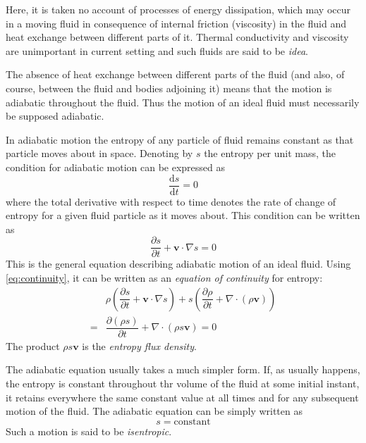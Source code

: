 \documentclass[conference]{IEEEtran}
\theoremstyle{definition}
\theoremstyle{remark}
\begin{document}
    Here, it is taken no account of processes of energy dissipation, which may occur in a moving fluid in consequence of internal friction (viscosity) in the fluid and heat exchange between different parts of it. Thermal conductivity and viscosity are unimportant in current setting and such fluids are said to be \emph{idea}.

    The absence of heat exchange between different parts of the fluid (and also, of course, between the fluid and bodies adjoining it) means that the motion is adiabatic throughout the fluid. Thus the motion of an ideal fluid must necessarily be supposed adiabatic.

    In adiabatic motion the entropy of any particle of fluid remains constant as that particle moves about in space. Denoting by $s$ the entropy per unit mass, the condition for adiabatic motion can be  expressed as
    \begin{equation}
        \dfrac{\mathrm{d} s}{\mathrm{d} t} = 0
    \end{equation}
    where the total derivative with respect to time denotes the rate of change of entropy for a given fluid particle as it moves about. This condition can be written as
    \begin{equation}
        \dfrac{\partial s}{\partial t} + \mathbf{v} \cdot \nabla s = 0
    \end{equation}
    This is the general equation describing adiabatic motion of an ideal fluid. Using \ref{eq:continuity}, it can be written as an \emph{equation of continuity} for entropy:
    \begin{align}
        & \rho \left(\dfrac{\partial s}{\partial t} + \mathbf{v} \cdot \nabla s \right) + s \left(\dfrac{\partial \rho}{\partial t} + \nabla \cdot (\rho \mathbf{v}) \right) \nonumber \\
        =& \dfrac{\partial (\rho s)}{\partial t} + \nabla \cdot (\rho s \mathbf{v}) = 0
    \end{align}
    The product $\rho s \mathbf{v}$ is the \emph{entropy flux density}.

    The adiabatic equation usually takes a much simpler form. If, as usually happens, the entropy is constant throughout thr volume of the fluid at some initial instant, it retains everywhere the same constant value at all times and for any subsequent motion of the fluid. The adiabatic equation can be simply written as
    \begin{equation}
        s = \text{constant}
    \end{equation}
    Such a motion is said to be \emph{isentropic}.
\end{document}
